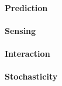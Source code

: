 \documentclass[10pt,letterpaper]{article}
\begin{document}
\paragraph{Prediction}

\paragraph{Sensing}

\paragraph{Interaction}


\paragraph{Stochasticity}
\end{document}
